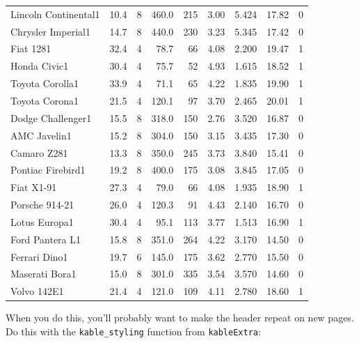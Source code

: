 \documentclass[a4paper, nobind]{templates/ociamthesis}
\begin{document}
\begin{longtable}{lrrrrrrrr}
Lincoln Continental1 & 10.4 & 8 & 460.0 & 215 & 3.00 & 5.424 & 17.82 & 0\\
Chrysler Imperial1 & 14.7 & 8 & 440.0 & 230 & 3.23 & 5.345 & 17.42 & 0\\
Fiat 1281 & 32.4 & 4 & 78.7 & 66 & 4.08 & 2.200 & 19.47 & 1\\
\addlinespace
Honda Civic1 & 30.4 & 4 & 75.7 & 52 & 4.93 & 1.615 & 18.52 & 1\\
Toyota Corolla1 & 33.9 & 4 & 71.1 & 65 & 4.22 & 1.835 & 19.90 & 1\\
Toyota Corona1 & 21.5 & 4 & 120.1 & 97 & 3.70 & 2.465 & 20.01 & 1\\
Dodge Challenger1 & 15.5 & 8 & 318.0 & 150 & 2.76 & 3.520 & 16.87 & 0\\
AMC Javelin1 & 15.2 & 8 & 304.0 & 150 & 3.15 & 3.435 & 17.30 & 0\\
\addlinespace
Camaro Z281 & 13.3 & 8 & 350.0 & 245 & 3.73 & 3.840 & 15.41 & 0\\
Pontiac Firebird1 & 19.2 & 8 & 400.0 & 175 & 3.08 & 3.845 & 17.05 & 0\\
Fiat X1-91 & 27.3 & 4 & 79.0 & 66 & 4.08 & 1.935 & 18.90 & 1\\
Porsche 914-21 & 26.0 & 4 & 120.3 & 91 & 4.43 & 2.140 & 16.70 & 0\\
Lotus Europa1 & 30.4 & 4 & 95.1 & 113 & 3.77 & 1.513 & 16.90 & 1\\
\addlinespace
Ford Pantera L1 & 15.8 & 8 & 351.0 & 264 & 4.22 & 3.170 & 14.50 & 0\\
Ferrari Dino1 & 19.7 & 6 & 145.0 & 175 & 3.62 & 2.770 & 15.50 & 0\\
Maserati Bora1 & 15.0 & 8 & 301.0 & 335 & 3.54 & 3.570 & 14.60 & 0\\
Volvo 142E1 & 21.4 & 4 & 121.0 & 109 & 4.11 & 2.780 & 18.60 & 1\\
\bottomrule
\end{longtable}

When you do this, you'll probably want to make the header repeat on new pages.
Do this with the \texttt{kable\_styling} function from \texttt{kableExtra}:
\end{document}
